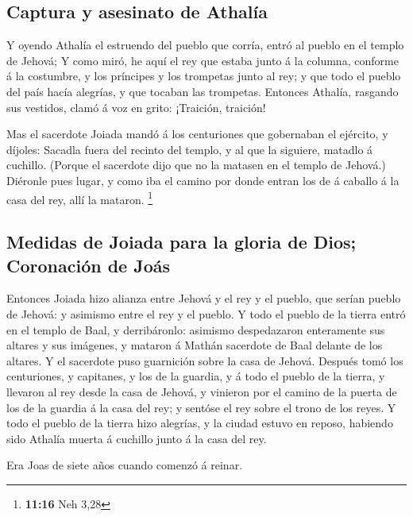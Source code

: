 \hypertarget{captura-y-asesinato-de-athaluxeda}{%
\subsection{Captura y asesinato de
Athalía}\label{captura-y-asesinato-de-athaluxeda}}

 Y oyendo Athalía el estruendo del pueblo que corría,
entró al pueblo en el templo de Jehová;  Y como miró, he
aquí el rey que estaba junto á la columna, conforme á la costumbre, y
los príncipes y los trompetas junto al rey; y que todo el pueblo del
país hacía alegrías, y que tocaban las trompetas. Entonces Athalía,
rasgando sus vestidos, clamó á voz en grito: ¡Traición, traición!

 Mas el sacerdote Joiada mandó á los centuriones que
gobernaban el ejército, y díjoles: Sacadla fuera del recinto del templo,
y al que la siguiere, matadlo á cuchillo. (Porque el sacerdote dijo que
no la matasen en el templo de Jehová.)  Diéronle pues
lugar, y como iba el camino por donde entran los de á caballo á la casa
del rey, allí la mataron. \footnote{\textbf{11:16} Neh 3,28}

\hypertarget{medidas-de-joiada-para-la-gloria-de-dios-coronaciuxf3n-de-jouxe1s}{%
\subsection{Medidas de Joiada para la gloria de Dios; Coronación de
Joás}\label{medidas-de-joiada-para-la-gloria-de-dios-coronaciuxf3n-de-jouxe1s}}

 Entonces Joiada hizo alianza entre Jehová y el rey y el
pueblo, que serían pueblo de Jehová: y asimismo entre el rey y el
pueblo.  Y todo el pueblo de la tierra entró en el templo
de Baal, y derribáronlo: asimismo despedazaron enteramente sus altares y
sus imágenes, y mataron á Mathán sacerdote de Baal delante de los
altares. Y el sacerdote puso guarnición sobre la casa de Jehová.
 Después tomó los centuriones, y capitanes, y los de la
guardia, y á todo el pueblo de la tierra, y llevaron al rey desde la
casa de Jehová, y vinieron por el camino de la puerta de los de la
guardia á la casa del rey; y sentóse el rey sobre el trono de los reyes.
 Y todo el pueblo de la tierra hizo alegrías, y la ciudad
estuvo en reposo, habiendo sido Athalía muerta á cuchillo junto á la
casa del rey.

 Era Joas de siete años cuando comenzó á reinar.

